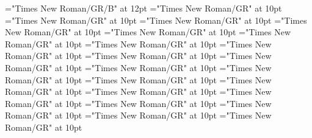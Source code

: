\documentclass[gps1,twoside]{article}
\begin{document}
\font\spanheadwordreferencedentryreferencedentriescomplexformentryrefcomplexformentryrefsminorentryvariant="Times New Roman/GR/B" at 12pt
\font\spanspandefinitionorglossreferencedentryreferencedentriescomplexformentryrefcomplexformentryrefsminorentryvariantbefore="Times New Roman/GR" at 10pt
\font\spandefinitionorglossreferencedentryreferencedentriescomplexformentryrefcomplexformentryrefsminorentryvariantfirstchildbefore="Times New Roman/GR" at 10pt
\font\spanspansummarycomplexformentryrefcomplexformentryrefsminorentryvariantbefore="Times New Roman/GR" at 10pt
\font\spansummarycomplexformentryrefcomplexformentryrefsminorentryvariantfirstchildbefore="Times New Roman/GR" at 10pt
\font\nontrivialentryrootnontrivialentryrootnontrivialentryrootscomplexformentryrefcomplexformentryrefsminorentryvariantbefore="Times New Roman/GR" at 10pt
\font\nontrivialentryrootscomplexformentryrefcomplexformentryrefsminorentryvariantbefore="Times New Roman/GR" at 10pt
\font\spanspansummarydefinitionminorentryvariantbefore="Times New Roman/GR" at 10pt
\font\spansummarydefinitionminorentryvariantfirstchildbefore="Times New Roman/GR" at 10pt
\font\spansummarydefinitionminorentryvariantlastchildafter="Times New Roman/GR" at 10pt
\font\spanspanvisiblecomplexformbackrefsminorentryvariantbefore="Times New Roman/GR" at 10pt
\font\visiblecomplexformbackrefsminorentryvariantbefore="Times New Roman/GR" at 10pt
\font\visiblecomplexformbackrefsminorentryvariantafter="Times New Roman/GR" at 10pt
\font\complexformtypesvisiblecomplexformbackrefvisiblecomplexformbackrefsminorentryvariantafter="Times New Roman/GR" at 10pt
\font\spanspanreverseabbrcomplexformtypecomplexformtypesvisiblecomplexformbackrefvisiblecomplexformbackrefsminorentryvariantbefore="Times New Roman/GR" at 10pt
\font\spanspanheadwordvisiblecomplexformbackrefvisiblecomplexformbackrefsminorentryvariantbefore="Times New Roman/GR" at 10pt
\font\spanspandefinitionorglossesvisiblecomplexformbackrefvisiblecomplexformbackrefsminorentryvariantbefore="Times New Roman/GR" at 10pt
\font{}="Times New Roman/GR" at 10pt
\font\spanspanowningentrysummarydefinitionvisiblecomplexformbackrefvisiblecomplexformbackrefsminorentryvariantbefore="Times New Roman/GR" at 10pt
\font\spanowningentrysummarydefinitionvisiblecomplexformbackrefvisiblecomplexformbackrefsminorentryvariantfirstchildbefore="Times New Roman/GR" at 10pt
\font\spanowningentrysummarydefinitionvisiblecomplexformbackrefvisiblecomplexformbackrefsminorentryvariantlastchildafter="Times New Roman/GR" at 10pt
\end{document}
